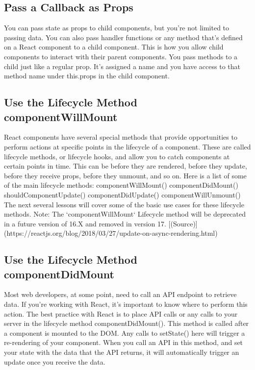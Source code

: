 \documentclass{article}%
\begin{document}
%
\subsection{Pass a Callback as Props}%
\label{subsec:PassaCallbackasProps}%
You can pass state as props to child components, but you're not limited to passing data. You can also pass handler functions or any method that's defined on a React component to a child component. This is how you allow child components to interact with their parent components. You pass methods to a child just like a regular prop. It's assigned a name and you have access to that method name under this.props in the child component.\newline%

%
\subsection{Use the Lifecycle Method componentWillMount}%
\label{subsec:UsetheLifecycleMethodcomponentWillMount}%
React components have several special methods that provide opportunities to perform actions at specific points in the lifecycle of a component. These are called lifecycle methods, or lifecycle hooks, and allow you to catch components at certain points in time. This can be before they are rendered, before they update, before they receive props, before they unmount, and so on. Here is a list of some of the main lifecycle methods:\newline%
componentWillMount()\newline%
componentDidMount()\newline%
shouldComponentUpdate()\newline%
componentDidUpdate()\newline%
componentWillUnmount()\newline%
The next several lessons will cover some of the basic use cases for these lifecycle methods.\newline%
Note: The `componentWillMount` Lifecycle method will be deprecated in a future version of 16.X and removed in version 17. {[}(Source){]}(https://reactjs.org/blog/2018/03/27/update{-}on{-}async{-}rendering.html)\newline%

%
\subsection{Use the Lifecycle Method componentDidMount}%
\label{subsec:UsetheLifecycleMethodcomponentDidMount}%
Most web developers, at some point, need to call an API endpoint to retrieve data. If you're working with React, it's important to know where to perform this action.\newline%
The best practice with React is to place API calls or any calls to your server in the lifecycle method componentDidMount(). This method is called after a component is mounted to the DOM. Any calls to setState() here will trigger a re{-}rendering of your component. When you call an API in this method, and set your state with the data that the API returns, it will automatically trigger an update once you receive the data.\newline%
\end{document}
